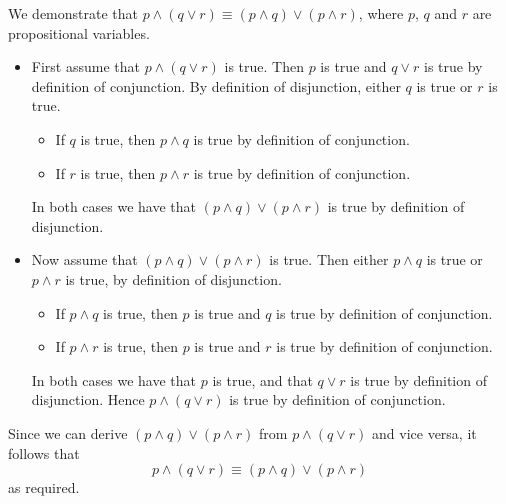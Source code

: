 \begin{example}
\label{exConjunctionDistributesOverDisjunction}
We demonstrate that $p \wedge (q \vee r) \equiv (p \wedge q) \vee (p \wedge r)$, where $p$, $q$ and $r$ are propositional variables.

\begin{itemize}
\item First assume that $p \wedge (q \vee r)$ is true. Then $p$ is true and $q \vee r$ is true by definition of conjunction. By definition of disjunction, either $q$ is true or $r$ is true.
\begin{itemize}
\item If $q$ is true, then $p \wedge q$ is true by definition of conjunction.
\item If $r$ is true, then $p \wedge r$ is true by definition of conjunction.
\end{itemize}
In both cases we have that $(p \wedge q) \vee (p \wedge r)$ is true by definition of disjunction.

\item Now assume that $(p \wedge q) \vee (p \wedge r)$ is true. Then either $p \wedge q$ is true or $p \wedge r$ is true, by definition of disjunction.
\begin{itemize}
\item If $p \wedge q$ is true, then $p$ is true and $q$ is true by definition of conjunction.
\item If $p \wedge r$ is true, then $p$ is true and $r$ is true by definition of conjunction.
\end{itemize}
In both cases we have that $p$ is true, and that $q \vee r$ is true by definition of disjunction. Hence $p \wedge (q \vee r)$ is true by definition of conjunction.
\end{itemize}

Since we can derive $(p \wedge q) \vee (p \wedge r)$ from $p \wedge (q \vee r)$ and vice versa, it follows that
\[ p \wedge (q \vee r) \equiv (p \wedge q) \vee (p \wedge r)\]
as required.
\end{example}

